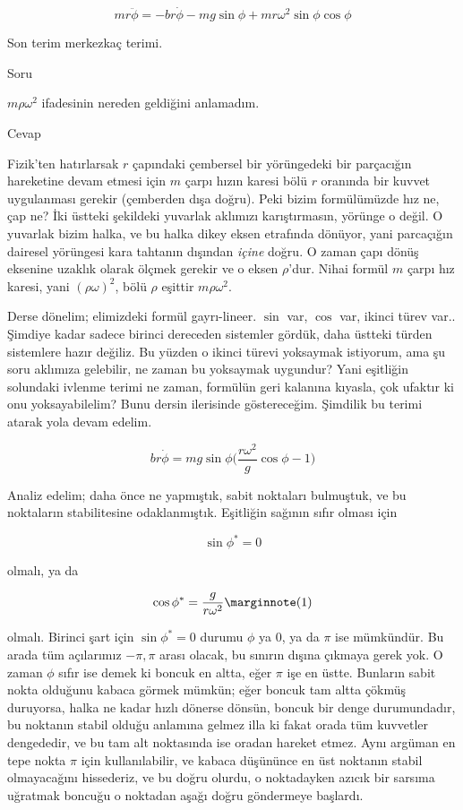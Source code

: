 \documentclass[12pt,fleqn]{article}\usepackage{../../common}
\begin{document}
$$ mr\ddot{\phi} = -br\dot{\phi} - mg\sin\phi + mr\omega^2\sin\phi\cos\phi $$

Son terim merkezkaç terimi.

Soru

$m\rho\omega^2$ ifadesinin nereden geldiğini anlamadım.

Cevap

Fizik'ten hatırlarsak $r$ çapındaki çembersel bir yörüngedeki bir parçacığın
hareketine devam etmesi için $m$ çarpı hızın karesi bölü $r$ oranında bir kuvvet
uygulanması gerekir (çemberden dışa doğru). Peki bizim formülümüzde hız ne, çap
ne? İki üstteki şekildeki yuvarlak aklımızı karıştırmasın, yörünge o değil. O
yuvarlak bizim halka, ve bu halka dikey eksen etrafında dönüyor, yani parcaçığın
dairesel yörüngesi kara tahtanın dışından {\em içine} doğru. O zaman çapı dönüş
eksenine uzaklık olarak ölçmek gerekir ve o eksen $\rho$'dur. Nihai formül $m$
çarpı hız karesi, yani $(\rho\omega)^2$, bölü $\rho$ eşittir $m\rho\omega^2$.

Derse dönelim; elimizdeki formül gayrı-lineer. $\sin$ var, $\cos$ var, ikinci
türev var.. Şimdiye kadar sadece birinci dereceden sistemler gördük, daha
üstteki türden sistemlere hazır değiliz. Bu yüzden o ikinci türevi yoksaymak
istiyorum, ama şu soru aklımıza gelebilir, ne zaman bu yoksaymak uygundur? Yani
eşitliğin solundaki ivlenme terimi ne zaman, formülün geri kalanına kıyasla,
çok ufaktır ki onu yoksayabilelim? Bunu dersin ilerisinde göstereceğim. Şimdilik
bu terimi atarak yola devam edelim.

$$ br\dot{\phi} = mg\sin\phi \bigg(
\frac{r\omega^2}{g} \cos\phi - 1
\bigg)
$$

Analiz edelim; daha önce ne yapmıştık, sabit noktaları bulmuştuk, ve bu
noktaların stabilitesine odaklanmıştık. Eşitliğin sağının sıfır olması için

$$ \sin\phi^\ast = 0 $$

olmalı, ya da

$$ \cos\phi^\ast = \frac{g}{r\omega^2} \mlabel{1}$$


olmalı. Birinci şart için $\sin\phi^\ast = 0$ durumu $\phi$ ya 0, ya da $\pi$ ise
mümkündür. Bu arada tüm açılarımız $-\pi,\pi$ arası olacak, bu sınırın dışına
çıkmaya gerek yok. O zaman $\phi$ sıfır ise demek ki boncuk en altta, eğer $\pi$
işe en üstte. Bunların sabit nokta olduğunu kabaca görmek mümkün; eğer boncuk
tam altta çökmüş duruyorsa, halka ne kadar hızlı dönerse dönsün, boncuk bir
denge durumundadır, bu noktanın stabil olduğu anlamına gelmez illa ki fakat
orada tüm kuvvetler dengededir, ve bu tam alt noktasında ise oradan hareket
etmez. Aynı argüman en tepe nokta $\pi$ için kullanılabilir, ve kabaca düşününce
en üst noktanın stabil olmayacağını hissederiz, ve bu doğru olurdu, o
noktadayken azıcık bir sarsıma uğratmak boncuğu o noktadan aşağı doğru
göndermeye başlardı. 
\end{document}

